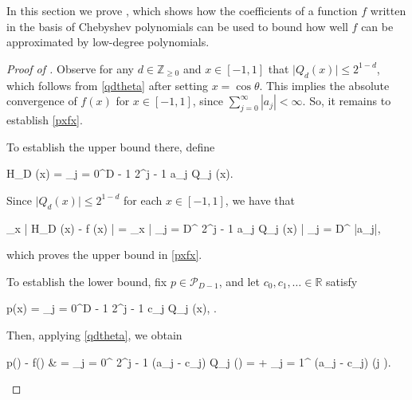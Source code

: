 \documentclass[10pt,a4paper]{article}
\theoremstyle{plain}\newtheorem{theorem}{Theorem}
\theoremstyle{definition}
\begin{document}
	\label{ProofSumaj}
	
	In this section we prove , which shows how the coefficients of a function $f$ written in the basis of Chebyshev polynomials can be used to bound how well $f$ can be approximated by low-degree polynomials.

	
	\begin{proof}[Proof of ] 
	
	    Observe for any $d \in \mathbb{Z}_{\ge 0}$ and $x \in [-1, 1]$ that $\big| Q_d (x) \big| \le 2^{1 - d}$, which follows from \eqref{qdtheta} after setting $x = \cos \theta$. This implies the absolute convergence of $f(x)$ for $x \in [-1, 1]$, since $\sum_{j = 0}^{\infty} |a_j| < \infty$. So, it remains to establish \eqref{pxfx}. 
		
		To establish the upper bound there, define
		\begin{flalign}
		\label{hdx}
		H_D (x) = \displaystyle\sum_{j = 0}^{D - 1} 2^{j - 1} a_j Q_j (x).
		\end{flalign}
		
		\noindent Since $\big| Q_d (x) \big| \le 2^{1 - d}$ for each $x \in [-1, 1]$, we have that 
		\begin{flalign}
		\label{hdxfxestimate} 
		\displaystyle\sup_{x \in [-1, 1]} \big| H_D (x) - f (x) \big|  = \displaystyle\sup_{x \in [-1, 1]} \Bigg| \displaystyle\sum_{j = D}^{\infty} 2^{j - 1} a_j Q_j (x)  \Bigg| \le \displaystyle\sum_{j = D}^{\infty} |a_j|,
		\end{flalign}
		
		\noindent which proves the upper bound in \eqref{pxfx}.
		
		To establish the lower bound, fix $p \in \mathcal{P}_{D - 1}$, and let $c_0, c_1, \ldots \in \mathbb{R}$ satisfy 
		\begin{flalign*}
		p(x) = \displaystyle\sum_{j = 0}^{D - 1} 2^{j - 1} c_j Q_j (x), \quad \text{and $c_j = 0$ for $j \ge D$}. 
		\end{flalign*}
		
		\noindent Then, applying \eqref{qdtheta}, we obtain 
		\begin{flalign}
		\label{pxfx1} 
		\begin{aligned}
		p(\cos \theta) - f(\cos \theta) & = \displaystyle\sum_{j = 0}^{\infty} 2^{j - 1} (a_j - c_j) Q_j (\cos \theta)  = \displaystyle{} + \displaystyle\sum_{j = 1}^{\infty} (a_j - c_j) \cos (j \theta).
		\end{aligned}
		\end{flalign} 
		

\end{proof}
\end{document}

